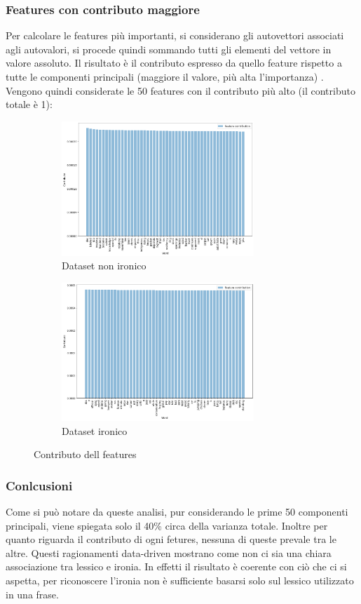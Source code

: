 \documentclass[oneside]{book}
\begin{document}
\subsubsection{Features con contributo maggiore}
Per calcolare le features più importanti, si considerano gli autovettori associati agli autovalori, si procede quindi sommando tutti gli elementi del vettore in valore assoluto. Il risultato è il contributo espresso da quello feature rispetto a tutte le componenti principali (maggiore il valore, più alta l'importanza) \cite{pcaeigenvectors}. Vengono quindi considerate le 50 features con il contributo più alto (il contributo totale è 1):

\begin{figure}[H]
	\begin{subfigure}[H]{0.5 \textwidth}
		\centering
		\includegraphics[width=7.25cm]{assets/pca/non_ironic/contribution.png}
		\caption{Dataset non ironico}
	\end{subfigure}
	\hfill
	\begin{subfigure}[H]{0.5 \textwidth}
		\centering
		\includegraphics[width=7.25cm]{assets/pca/ironic/contribution.png}
		\caption{Dataset ironico}
	\end{subfigure}
	\caption{Contributo dell features}
\end{figure}

\subsubsection{Conlcusioni}
Come si può notare da queste analisi, pur considerando le prime 50 componenti principali, viene spiegata solo il 40\% circa della varianza totale. Inoltre per quanto riguarda il contributo di ogni fetures, nessuna di queste prevale tra le altre. Questi ragionamenti data-driven mostrano come non ci sia una chiara associazione tra lessico e ironia. In effetti il risultato è coerente con ciò che ci si aspetta, per riconoscere l'ironia non è sufficiente basarsi solo sul lessico utilizzato in una frase.
\end{document}

